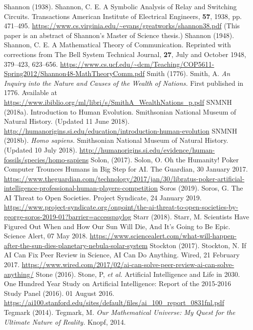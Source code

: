 \begin{multicols}{2}
\begin{thebibliography}{99}
 Shannon (1938). Shannon, C. E. A Symbolic Analysis of Relay and Switching Circuits. Transactions American Institute of Electrical Engineers, \textbf{57}, 1938, pp. 471--495. \url{https://www.cs.virginia.edu/~evans/greatworks/shannon38.pdf} (This paper is an abstract of Shannon’s Master of Science thesis.)
 Shannon (1948). Shannon, C. E. A Mathematical Theory of Communication. Reprinted with corrections from The Bell System Technical Journal, \textbf{27}, July and October 1948, 379–423, 623–656. \url{https://www.cs.ucf.edu/~dcm/Teaching/COP5611-Spring2012/Shannon48-MathTheoryComm.pdf}
 Smith (1776). Smith, A. \textit{An Inquiry into the Nature and Causes of the Wealth of Nations.} First published in 1776. Available at \url{https://www.ibiblio.org/ml/libri/s/SmithA_WealthNations_p.pdf}
 SNMNH (2018a). Introduction to Human Evolution. Smithsonian National Museum of Natural History. (Updated 11 June 2018). \url{http://humanorigins.si.edu/education/introduction-human-evolution}
 SNMNH (2018b). \textit{Homo sapiens.} Smithsonian National Museum of Natural History. (Updated 10 July 2018). \url{http://humanorigins.si.edu/evidence/human-fossils/species/homo-sapiens}
 Solon, (2017). Solon, O. Oh the Humanity! Poker Computer Trounces Humans in Big Step for AI. The Guardian, 30 January 2017. \url{https://www.theguardian.com/technology/2017/jan/30/libratus-poker-artificial-intelligence-professional-human-players-competition}
 Soros (2019). Soros, G. The AI Threat to Open Societies. Project Syndicate, 24 January 2019. \url{https://www.project-syndicate.org/onpoint/the-ai-threat-to-open-societies-by-george-soros-2019-01?barrier=accesspaylog}
 Starr (2018). Starr, M. Scientists Have Figured Out When and How Our Sun Will Die, And It's Going to Be Epic. Science Alert, 07 May 2018. \url{https://www.sciencealert.com/what-will-happen-after-the-sun-dies-planetary-nebula-solar-system}
 Stockton (2017). Stockton, N. If AI Can Fix Peer Review in Science, AI Can Do Anything. Wired, 21 February 2017. \url{https://www.wired.com/2017/02/ai-can-solve-peer-review-ai-can-solve-anything/}
 Stone (2016). Stone, P, \textit{et al.} Artificial Intelligence and Life in 2030. One Hundred Year Study on Artificial Intelligence: Report of the 2015-2016 Study Panel (2016). 01 August 2016. \url{https://ai100.stanford.edu/sites/default/files/ai_100_report_0831fnl.pdf}
 Tegmark (2014). Tegmark, M. \textit{Our Mathematical Universe: My Quest for the Ultimate Nature of Reality.} Knopf, 2014.

\end{thebibliography}
\end{multicols}
